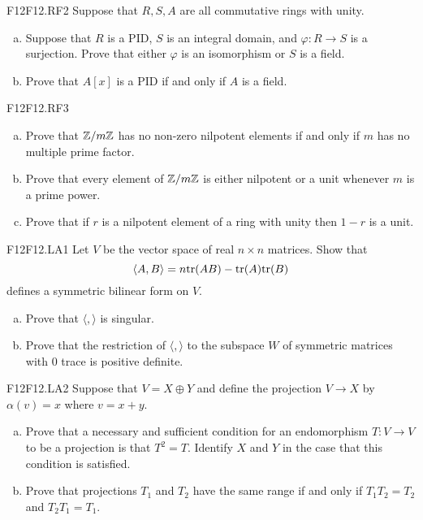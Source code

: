 \documentclass[../AlgebraQualSolutions.tex]{subfiles}
\begin{document}
	\begin{prob}{F12}{F12.RF2}
	Suppose that $R,S,A$ are all commutative rings with unity.
	\begin{enumerate}[(a)]
	\item Suppose that $R$ is a PID, $S$ is an integral domain, and $\varphi:R \to S$ is a surjection. Prove that either $\varphi$ is an isomorphism or $S$ is a field.
	\item Prove that $A[x]$ is a PID if and only if $A$ is a field.
	\end{enumerate}
	\end{prob}
	
	\begin{prob}{F12}{F12.RF3}
	\begin{enumerate}[(a)]
	\item Prove that $\mathbb{Z}/m\mathbb{Z}$ has no non-zero nilpotent elements if and only if $m$ has no multiple prime factor.
	\item Prove that every element of $\mathbb{Z}/m\mathbb{Z}$ is either nilpotent or a unit whenever $m$ is a prime power.
	\item Prove that if $r$ is a nilpotent element of a ring with unity then $1-r$ is a unit.
	\end{enumerate}
	\end{prob}
	
	\begin{prob}{F12}{F12.LA1}
	Let $V$ be the vector space of real $n \times n$ matrices. Show that 	
		\[\langle A, B \rangle = n \mathrm{tr}(AB) - \mathrm{tr}(A)\mathrm{tr}(B) \]
	defines a symmetric bilinear form on $V$.
	\begin{enumerate}[(a)]
	\item Prove that $\langle,\rangle$ is singular.
	\item Prove that the restriction of $\langle,\rangle$ to the subspace $W$ of symmetric matrices with 0 trace is positive definite.
	\end{enumerate}
	\end{prob}
	
	\begin{prob}{F12}{F12.LA2}
	Suppose that $V = X \oplus Y$ and define the projection $V \to X$ by $\alpha(v) = x$ where $v = x+y$.
	\begin{enumerate}[(a)]
	\item Prove that a necessary and sufficient condition for an endomorphism $T: V \to V$ to be a projection is that $T^2 = T$. Identify $X$ and $Y$ in the case that this condition is satisfied.
	\item Prove that projections $T_1$ and $T_2$ have the same range if and only if $T_1T_2 = T_2$ and $T_2T_1 = T_1$.
	\end{enumerate}
	\end{prob}
\end{document}
